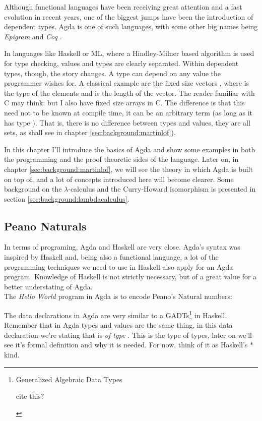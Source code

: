 Although functional languages have been receiving great attention
and a fast evolution in recent years, one of the biggest jumps
have been the introduction of dependent types. Agda\cite{norell07} is one of such languages, with some other 
big names being \emph{Epigram} \cite{mcbride05} and \emph{Coq} \cite{bertot06}. 

In languages like Haskell or ML, where a Hindley-Milner based algorithm is used
for type checking, values and types are clearly separated. Within dependent
types, though, the story changes. A type can depend on any value the programmer
wishes for. A classical example are the fixed size vectors , where 
is the type of the elements and  is the length of the vector. The reader familiar
with C may think: but I also have fixed size arrays in C. The difference is that
this  need not to be known at compile time, it can be an arbitrary term (as long
as it has type ). That is, there is no difference between types and values,
they are all sets, as shall see in chapter \ref{sec:background:martinlof}).

In this chapter I'll introduce the basics of Agda and show some examples in both
the programming and the proof theoretic sides of the language. Later on, in 
chapter \ref{sec:background:martinlof}, we will see the theory in which Agda is built 
on top of, and a lot of concepts introduced here will become clearer. 
Some background on the $\lambda$-calculus and the Curry-Howard isomorphism is
presented in section \ref{sec:background:lambdacalculus}.

\subsection{Peano Naturals}

In terms of programing, Agda and Haskell are very close. Agda's syntax was
inspired by Haskell and, being also a functional language, a lot of
the programming techniques we need to use in Haskell also apply for an Agda program.
Knowledge of Haskell is not strictly necessary, but of a great value for a better
understating of Agda.\\

The \emph{Hello World} program in Agda is to encode Peano's Natural numbers:


The data declarations in Agda are very similar to a GADTs\footnote{
Generalized Algebraic Data Types
\begin{TODO}
  \item cite this?
\end{TODO}
} in Haskell. Remember that in Agda types and values are the same thing, 
in this data declaration we're stating that  is \emph{of type} 
. This  is the type of types, later on we'll
see it's formal definition and why it is needed. For now, think of it
as Haskell's $*$ kind.


